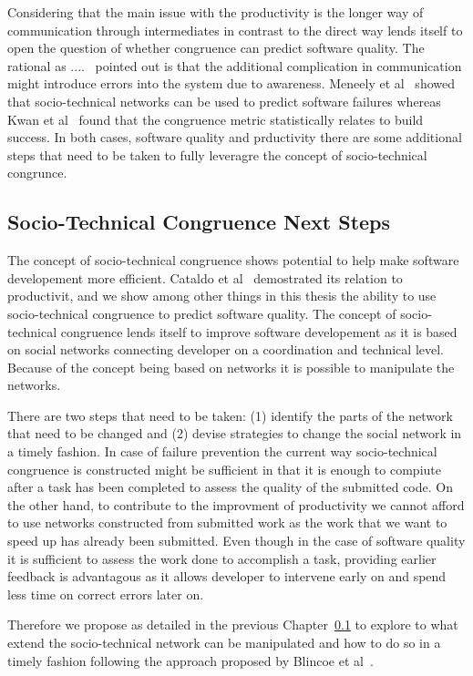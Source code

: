 Considering that the main issue with the productivity is the longer way of communication through intermediates in contrast to the direct way lends itself to open the question of whether congruence can predict software quality.
The rational as ....~\cite{} pointed out is that the additional complication in communication might introduce errors into the system due to awareness.
Meneely et al~\cite{} showed that socio-technical networks can be used to predict software failures whereas Kwan et al~\cite{} found that the congruence metric statistically relates to build success.
In both cases, software quality and prductivity there are some additional steps that need to be taken to fully leveragre the concept of socio-technical congrunce.

\subsection{Socio-Technical Congruence Next Steps}
The concept of socio-technical congruence shows potential to help make software developement more efficient.
Cataldo et al~\cite{} demostrated its relation to productivit, and we show among other things in this thesis the ability to use socio-technical congruence to predict software quality.
The concept of socio-technical congruence lends itself to improve software developement as it is based on social networks connecting developer on a coordination and technical level.
Because of the concept being based on networks it is possible to manipulate the networks.

There are two steps that need to be taken:
(1) identify the parts of the network that need to be changed
and (2) devise strategies to change the social network in a timely fashion.
In case of failure prevention the current way socio-technical congruence is constructed might be sufficient in that it is enough to compiute after a task has been completed to assess the quality of the submitted code.
On the other hand, to contribute to the improvment of productivity we cannot afford to use networks constructed from submitted work as the work that we want to speed up has already been submitted.
Even though in the case of software quality it is sufficient to assess the work done to accomplish a task, providing earlier feedback is advantagous as it allows developer to intervene early on and spend less time on correct errors later on.

Therefore we propose as detailed in the previous Chapter~\ref{} to explore to what extend the socio-technical network can be manipulated and how to do so in a timely fashion following the approach proposed by Blincoe et al~\cite{}.

